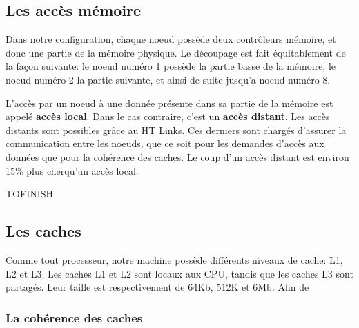   \subsection{Les accès mémoire}

    Dans notre configuration, chaque noeud possède deux contrôleurs mémoire, et
    donc une partie de la mémoire physique. Le découpage est fait équitablement
    de la façon suivante: le noeud numéro 1 possède la partie basse de la
    mémoire, le noeud numéro 2 la partie suivante, et ainsi de suite jusqu'a
    noeud numéro 8.

    L'accès par un noeud à une donnée présente dans sa partie de la mémoire est
    appelé \textbf{accès local}. Dans le cas contraire, c'est un \textbf{accès
      distant}. Les accès distants sont possibles grâce au HT Links. Ces
    derniers sont chargés d'assurer la communication entre les noeuds, que ce
    soit pour les demandes d'accès aux données que pour la cohérence des
    caches. Le coup d'un accès distant est environ 15\% plus \og cher\fg qu'un
    accès local.

    TOFINISH

  \subsection{Les caches}

    Comme tout processeur, notre machine possède différents niveaux de cache:
    L1, L2 et L3. Les caches L1 et L2 sont locaux aux CPU, tandis que les caches
    L3 sont partagés. Leur taille est respectivement de 64Kb, 512K et 6Mb. Afin de 
    \subsubsection{La cohérence des caches}
    
